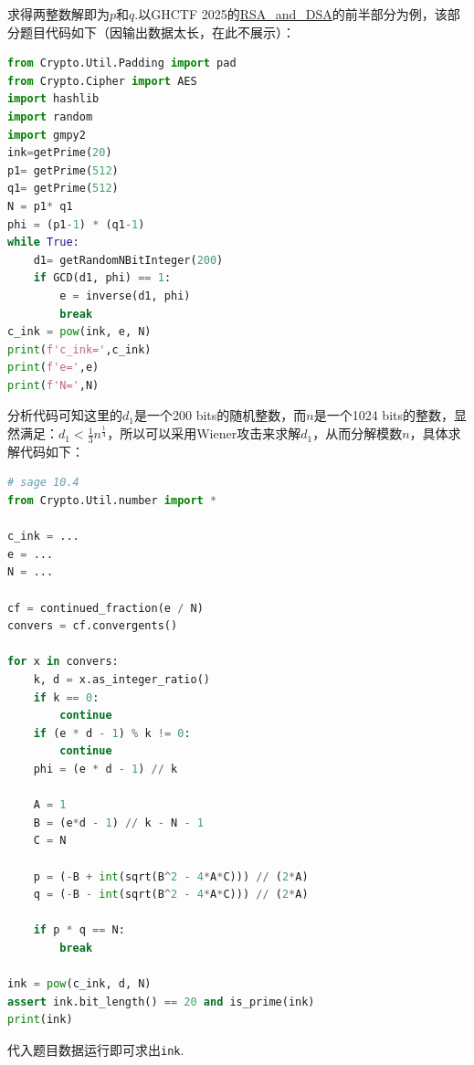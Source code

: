 \documentclass{book}
\numberwithin{equation}{subsubsection}
\begin{document}
求得两整数解即为$p$和$q$.以GHCTF 2025的\href{https://www.nssctf.cn/problem/6540}{RSA\_and\_DSA}的前半部分为例，该部分题目代码如下（因输出数据太长，在此不展示）：
\begin{lstlisting}[language=Python,basicstyle=\ttfamily,breaklines=true,keywordstyle=\bfseries\color{blue}]
from Crypto.Util.Padding import pad
from Crypto.Cipher import AES
import hashlib
import random
import gmpy2
ink=getPrime(20)
p1= getPrime(512)
q1= getPrime(512)
N = p1* q1
phi = (p1-1) * (q1-1)
while True:
    d1= getRandomNBitInteger(200)
    if GCD(d1, phi) == 1:
        e = inverse(d1, phi)
        break
c_ink = pow(ink, e, N)
print(f'c_ink=',c_ink)
print(f'e=',e)
print(f'N=',N)
\end{lstlisting}
分析代码可知这里的$d_1$是一个200 bits的随机整数，而$n$是一个1024 bits的整数，显然满足：$d_1<\frac{1}{3}n^{\frac{1}{4}}$，所以可以采用Wiener攻击来求解$d_1$，从而分解模数$n$，具体求解代码如下：
\begin{lstlisting}[language=Python,basicstyle=\ttfamily,breaklines=true,keywordstyle=\bfseries\color{blue}]
# sage 10.4
from Crypto.Util.number import *

c_ink = ...
e = ...
N = ...

cf = continued_fraction(e / N)
convers = cf.convergents()

for x in convers:
    k, d = x.as_integer_ratio()
    if k == 0:
        continue
    if (e * d - 1) % k != 0:
        continue
    phi = (e * d - 1) // k
    
    A = 1
    B = (e*d - 1) // k - N - 1
    C = N

    p = (-B + int(sqrt(B^2 - 4*A*C))) // (2*A)
    q = (-B - int(sqrt(B^2 - 4*A*C))) // (2*A)

    if p * q == N:
        break

ink = pow(c_ink, d, N)
assert ink.bit_length() == 20 and is_prime(ink)
print(ink)
\end{lstlisting}
代入题目数据运行即可求出\texttt{ink}.\par
\end{document}
